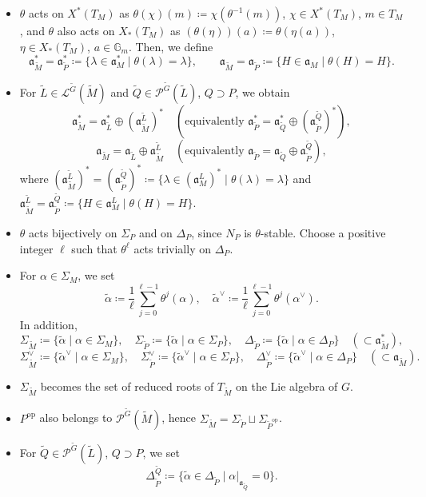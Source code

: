 \documentclass[12pt]{amsart}
\theoremstyle{definition}
\theoremstyle{plain}
\theoremstyle{remark}
\newcommand{\fa}{\mathfrak{a}}
\newcommand{\cL}{\mathcal{L}}
\newcommand{\cP}{\mathcal{P}}
\numberwithin{equation}{section}
\newcommand{\tG}{\widetilde{G}}
\newcommand{\tM}{\widetilde{M}}
\newcommand{\tL}{\widetilde{L}}
\newcommand{\tP}{\widetilde{P}}
\newcommand{\tQ}{\widetilde{Q}}
\newcommand{\op}{\mathrm{op}}
\newcommand{\talpha}{\widetilde{\alpha}}
\begin{document}
\begin{itemize}
    \item $\theta$ acts on $X^*(T_M)$ as $\theta(\chi)(m)\coloneqq \chi(\theta^{-1}(m))$, $\chi\in X^*(T_M)$, $m\in T_M$, and $\theta$ also acts on $X_*(T_M)$ as $(\theta(\eta))(a)\coloneqq \theta(\eta(a))$, $\eta\in X_*(T_M)$, $a\in \mathbb{G}_m$. 
    Then, we define
    \[
    \fa^*_{\tM}=\fa_{\tP}^*\coloneqq \{ \lambda\in \fa^*_M \mid \theta(\lambda)=\lambda \}, \qquad 
    \fa_{\tM}=\fa_{\tP}\coloneqq \{ H\in \fa_M \mid \theta(H)=H \}.
    \]
    \item For $\tL\in \cL^{\tG}(\tM)$ and $\tQ\in\cP^{\tG}(\tL)$, $Q\supset P$, we obtain
    \[
    \fa_{\tM}^*=\fa_{\tL}^*\oplus (\fa^{\tL}_{\tM})^* \quad (\text{equivalently }\fa_{\tP}^*=\fa_{\tQ}^*\oplus (\fa^{\tQ}_{\tP})^*),
    \]
    \[
    \fa_{\tM}=\fa_{\tL}\oplus \fa^{\tL}_{\tM} \quad (\text{equivalently }\fa_{\tP}=\fa_{\tQ}\oplus \fa^{\tQ}_{\tP}),
    \]
    where $(\fa^{\tL}_{\tM})^*=(\fa^{\tQ}_{\tP})^*\coloneqq\{\lambda\in (\fa^{L}_{M})^* \mid \theta(\lambda)=\lambda\}$ and $\fa^{\tL}_{\tM}=\fa^{\tQ}_{\tP}\coloneqq\{H\in \fa^{L}_{M} \mid \theta(H)=H\}$.
    \item $\theta$ acts bijectively on $\Sigma_P$ and on $\Delta_P$, since $N_P$ is $\theta$-stable.
    Choose a positive integer $\ell$ such that $\theta^\ell$ acts trivially on $\Delta_P$.
    \item For $\alpha\in\Sigma_M$, we set
    \[
    \talpha\coloneqq\frac{1}{\ell}\sum_{j=0}^{\ell-1}\theta^j(\alpha), \quad \talpha^\vee\coloneqq\frac{1}{\ell}\sum_{j=0}^{\ell-1}\theta^j(\alpha^\vee).
    \]
    In addition, 
    \[
    \Sigma_{\tM}\coloneqq\{\talpha\mid \alpha\in\Sigma_M\}, \quad \Sigma_{\tP}\coloneqq\{\talpha\mid \alpha\in\Sigma_P\}, \quad \Delta_{\tP}\coloneqq\{\talpha\mid \alpha\in\Delta_P\} \quad (\subset \fa_{\tM}^*),
    \]
    \[
    \Sigma_{\tM}^\vee\coloneqq\{\talpha^\vee\mid \alpha\in\Sigma_M\}, \quad \Sigma_{\tP}^\vee\coloneqq\{\talpha^\vee\mid \alpha\in\Sigma_P\}, \quad \Delta_{\tP}^\vee\coloneqq\{\talpha^\vee\mid \alpha\in\Delta_P\} \quad (\subset \fa_{\tM}).
    \]
    \item $\Sigma_{\tM}$ becomes the set of reduced roots of $T_{\tM}$ on the Lie algebra of $G$.
    \item $P^\op$ also belongs to $\cP^{\tG}(\tM)$, hence $\Sigma_{\tM}=\Sigma_{\tP}\sqcup\Sigma_{\tP^\op}$. 
    \item For $\tQ\in\cP^{\tG}(\tL)$, $Q\supset P$, we set
    \[
    \Delta_{\tP}^{\tQ}\coloneqq \{\talpha\in\Delta_{\tP} \mid \alpha|_{\fa_{\tQ}}=0 \}.
    \]
\end{itemize}
\end{document}
